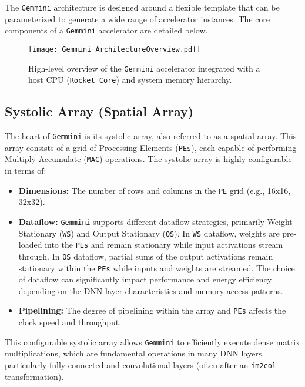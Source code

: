 The \texttt{Gemmini} architecture is designed around a flexible template that can be parameterized to generate a wide range of accelerator instances. The core components of a \texttt{Gemmini} accelerator are detailed below.

\begin{figure}[h!]
    \centering
    \texttt{[image: Gemmini\_ArchitectureOverview.pdf]}
    \caption{High-level overview of the \texttt{Gemmini} accelerator integrated with a host CPU (\texttt{Rocket Core}) and system memory hierarchy.}
    \label{fig:gemmini_soc_overview}
\end{figure}

\subsection{Systolic Array (Spatial Array)}
\label{subsec:gemmini_systolic_array}
The heart of \texttt{Gemmini} is its systolic array, also referred to as a spatial array. This array consists of a grid of Processing Elements (\texttt{PEs}), each capable of performing Multiply-Accumulate (\texttt{MAC}) operations. The systolic array is highly configurable in terms of:
\begin{itemize}
    \item \textbf{Dimensions:} The number of rows and columns in the \texttt{PE} grid (e.g., 16x16, 32x32).
    \item \textbf{Dataflow:} \texttt{Gemmini} supports different dataflow strategies, primarily Weight Stationary (\texttt{WS}) and Output Stationary (\texttt{OS}). In \texttt{WS} dataflow, weights are pre-loaded into the \texttt{PEs} and remain stationary while input activations stream through. In \texttt{OS} dataflow, partial sums of the output activations remain stationary within the \texttt{PEs} while inputs and weights are streamed. The choice of dataflow can significantly impact performance and energy efficiency depending on the DNN layer characteristics and memory access patterns.
    \item \textbf{Pipelining:} The degree of pipelining within the array and \texttt{PEs} affects the clock speed and throughput.
\end{itemize}
This configurable systolic array allows \texttt{Gemmini} to efficiently execute dense matrix multiplications, which are fundamental operations in many DNN layers, particularly fully connected and convolutional layers (often after an \texttt{im2col} transformation).

